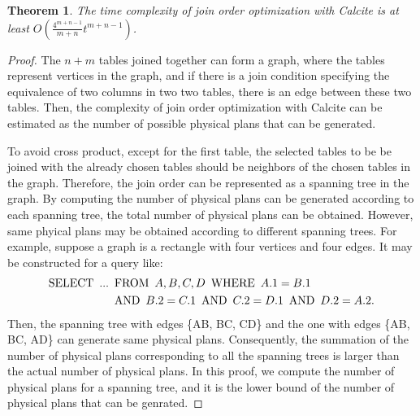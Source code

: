 \documentclass[sigconf, nonacm]{acmart}
\newtheorem{theorem}{Theorem}
\begin{document}
\begin{theorem}
    \label{theorem:complexity-of-calcite}
    The time complexity of join order optimization with Calcite is at least $O(\frac{4^{m+n-1}}{m+n}t^{m+n-1})$.
\end{theorem}
\begin{proof}
    The $n + m$ tables joined together can form a graph, where the tables represent vertices in the graph, and if there is a join condition specifying the equivalence of two columns in two two tables, there is an edge between these two tables.
    Then, the complexity of join order optimization with Calcite can be estimated as the number of possible physical plans that can be generated.
    
    To avoid cross product, except for the first table, the selected tables to be be joined with the already chosen tables should be neighbors of the chosen tables in the graph.
    Therefore, the join order can be represented as a spanning tree in the graph.
    By computing the number of physical plans can be generated according to each spanning tree, the total number of physical plans can be obtained.
    However, same phyical plans may be obtained according to different spanning trees.
    For example, suppose a graph is a rectangle with four vertices and four edges.
    It may be constructed for a query like:
    \begin{equation*}
        \begin{split}
            \text{SELECT}\hspace{.5em} ... & \hspace{.5em}\text{FROM}\hspace{.5em} A, B, C, D \hspace{.5em}\text{WHERE}\hspace{.5em} A.1 = B.1 \\ 
            & \hspace{.5em}\text{AND}\hspace{.5em} B.2 = C.1 \hspace{.5em}\text{AND}\hspace{.5em} C.2 = D.1 \hspace{.5em}\text{AND}\hspace{.5em} D.2 = A.2. 
        \end{split}
    \end{equation*}
    Then, the spanning tree with edges \{AB, BC, CD\} and the one with edges \{AB, BC, AD\} can generate same physical plans.
    Consequently, the summation of the number of physical plans corresponding to all the spanning trees is larger than the actual number of physical plans.
    In this proof, we compute the number of physical plans for a spanning tree, and it is the lower bound of the number of physical plans that can be genrated.


\end{proof}
\end{document}
